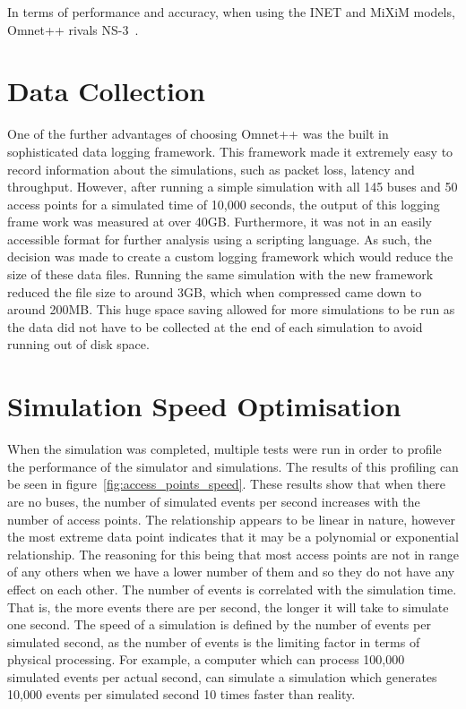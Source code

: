         In terms of performance and accuracy, when using the INET and MiXiM models, Omnet++ rivals NS-3~\cite{networksimulatorcomparison}.


    \section{Data Collection}\label{simulation_simulator_options_data_collection}

        One of the further advantages of choosing Omnet++ was the built in sophisticated data logging framework. This framework made it extremely easy to record information about the simulations, such as packet loss, latency and throughput. However, after running a simple simulation with all 145 buses and 50 access points for a simulated time of 10,000 seconds, the output of this logging frame work was measured at over 40GB. Furthermore, it was not in an easily accessible format for further analysis using a scripting language. As such, the decision was made to create a custom logging framework which would reduce the size of these data files. Running the same simulation with the new framework reduced the file size to around 3GB, which when compressed came down to around 200MB. This huge space saving allowed for more simulations to be run as the data did not have to be collected at the end of each simulation to avoid running out of disk space. 

    \section{Simulation Speed Optimisation}\label{simulation_simulator_options_simulation_speed_optimisation}

        When the simulation was completed, multiple tests were run in order to profile the performance of the simulator and simulations. The results of this profiling can be seen in figure~\ref{fig:access_points_speed}. These results show that when there are no buses, the number of simulated events per second increases with the number of access points. The relationship appears to be linear in nature, however the most extreme data point indicates that it may be a polynomial or exponential relationship. The reasoning for this being that most access points are not in range of any others when we have a lower number of them and so they do not have any effect on each other. The number of events is correlated with the simulation time. That is, the more events there are per second, the longer it will take to simulate one second. The speed of a simulation is defined by the number of events per simulated second, as the number of events is the limiting factor in terms of physical processing. For example, a computer which can process 100,000 simulated events per actual second, can simulate a simulation which generates 10,000 events per simulated second 10 times faster than reality. 


